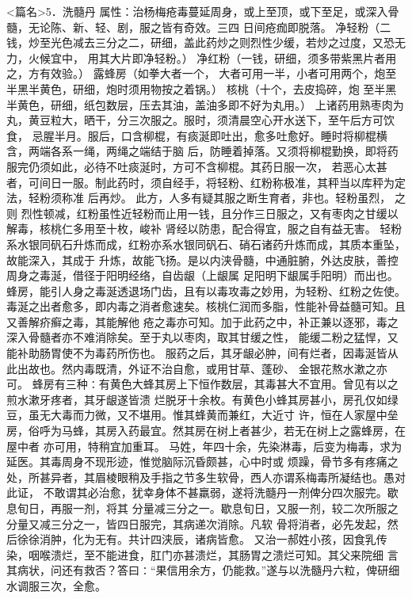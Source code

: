 \documentclass[a4paper,12pt,UTF8,twoside]{ctexbook}
\begin{document}
<篇名>5．洗髓丹
属性：治杨梅疮毒蔓延周身，或上至顶，或下至足，或深入骨髓，无论陈、新、轻、剧，服之皆有奇效。三四 
日间疮痂即脱落。 
净轻粉（二钱，炒至光色减去三分之二，研细，盖此药炒之则烈性少缓，若炒之过度，又恐无力，火候宜中， 
用其大片即净轻粉。） 净红粉（一钱，研细，须多带紫黑片者用之，方有效验。） 露蜂房（如拳大者一个， 
大者可用一半，小者可用两个，炮至半黑半黄色，研细，炮时须用物按之着锅。） 核桃（十个，去皮捣碎，炮 
至半黑半黄色，研细，纸包数层，压去其油，盖油多即不好为丸用。） 
上诸药用熟枣肉为丸，黄豆粒大，晒干，分三次服之。服时，须清晨空心开水送下，至午后方可饮食， 
忌腥半月。服后，口含柳棍，有痰涎即吐出，愈多吐愈好。睡时将柳棍横含，两端各系一绳，两绳之端结于脑 
后，防睡着掉落。又须将柳棍勤换，即将药服完仍须如此，必待不吐痰涎时，方可不含柳棍。其药日服一次， 
若恶心太甚者，可间日一服。制此药时，须自经手，将轻粉、红粉称极准，其秤当以库秤为定法，轻粉须称准 
后再炒。 
此方，人多有疑其服之断生育者，非也。轻粉虽烈， 之则 
烈性顿减，红粉虽性近轻粉而止用一钱，且分作三日服之，又有枣肉之甘缓以解毒，核桃仁多用至十枚，峻补 
肾经以防患，配合得宜，服之自有益无害。 
轻粉系水银同矾石升炼而成，红粉亦系水银同矾石、硝石诸药升炼而成，其质本重坠，故能深入，其成于 
升炼，故能飞扬。是以内浃骨髓，中通脏腑，外达皮肤，善控周身之毒涎，借径于阳明经络，自齿龈（上龈属 
足阳明下龈属手阳明）而出也。蜂房，能引人身之毒涎透退场门齿，且有以毒攻毒之妙用，为轻粉、红粉之佐使。 
毒涎之出者愈多，即内毒之消者愈速矣。核桃仁润而多脂，性能补骨益髓可知。且又善解疥癣之毒，其能解他 
疮之毒亦可知。加于此药之中，补正兼以逐邪，毒之深入骨髓者亦不难消除矣。至于丸以枣肉，取其甘缓之性， 
能缓二粉之猛悍，又能补助肠胃使不为毒药所伤也。 
服药之后，其牙龈必肿，间有烂者，因毒涎皆从此出故也。然内毒既清，外证不治自愈，或用甘草、蓬砂、 
金银花熬水漱之亦可。 
蜂房有三种∶有黄色大蜂其房上下恒作数层，其毒甚大不宜用。曾见有以之煎水漱牙疼者，其牙龈遂皆溃 
烂脱牙十余枚。有黄色小蜂其房甚小，房孔仅如绿豆，虽无大毒而力微，又不堪用。惟其蜂黄而兼红，大近寸 
许，恒在人家屋中垒房，俗呼为马蜂，其房入药最宜。然其房在树上者甚少，若无在树上之露蜂房，在屋中者 
亦可用，特稍宜加重耳。 
马姓，年四十余，先染淋毒，后变为梅毒，求为延医。其毒周身不现形迹，惟觉脑际沉昏颇甚，心中时或 
烦躁，骨节多有疼痛之处，所甚异者，其眉棱眼稍及手指之节多生软骨，西人亦谓系梅毒所凝结也。愚对此证， 
不敢谓其必治愈，犹幸身体不甚羸弱，遂将洗髓丹一剂俾分四次服完。歇息旬日，再服一剂，将其 
分量减三分之一。歇息旬日，又服一剂，较二次所服之分量又减三分之一，皆四日服完，其病递次消除。凡软 
骨将消者，必先发起，然后徐徐消肿，化为无有。共计四浃辰，诸病皆愈。 
又治一郝姓小孩，因食乳传染，咽喉溃烂，至不能进食，肛门亦甚溃烂，其肠胃之溃烂可知。其父来院细 
言其病状，问还有救否？答曰∶“果信用余方，仍能救。”遂与以洗髓丹六粒，俾研细水调服三次，全愈。 
\end{document}

